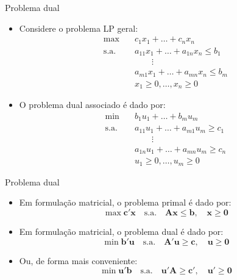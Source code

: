 \documentclass[10pt]{beamer}
\begin{document}
\begin{frame}{Problema dual}
    \begin{itemize}
        \item Considere o problema LP geral:
        \begin{align}
            \max \quad & c_1 x_1 + \dots + c_n x_n \\
            \text{s.a.} \quad & a_{11}x_1 + \dots + a_{1n}x_n \leq b_1\nonumber\\
            & \qquad \vdots \nonumber\\
            & a_{m1}x_1 + \dots + a_{mn}x_n \leq b_m\nonumber\\
            & x_1 \geq 0, \dots, x_n \geq 0\nonumber
        \end{align}
        \item O problema dual associado é dado por:
        \begin{align}
            \min \quad & b_1 u_1 + \dots + b_m u_m \\
            \text{s.a.} \quad & a_{11}u_1 + \dots + a_{m1}u_m \geq c_1\nonumber\\
            & \qquad \vdots \nonumber\\
            & a_{1n}u_1 + \dots + a_{mn}u_m \geq c_n\nonumber\\
            & u_1 \geq 0, \dots, u_m \geq 0\nonumber
        \end{align}
    \end{itemize}
\end{frame}

\begin{frame}{Problema dual}
    \begin{itemize}
        \item Em formulação matricial, o problema primal é dado por:
        \begin{equation}
            \max \mathbf{c'x} \quad \text{s.a.} \quad \mathbf{Ax \leq b}, \quad \mathbf{x\geq 0}
        \end{equation}
        \item Em formulação matricial, o problema dual é dado por:
        \begin{equation}
            \min \mathbf{b'u} \quad \text{s.a.} \quad \mathbf{A'u \geq c}, \quad \mathbf{u\geq 0}
        \end{equation}
        \item Ou, de forma mais conveniente:
        \begin{equation}
            \min \mathbf{u'b} \quad \text{s.a.} \quad \mathbf{u'A \geq c'}, \quad \mathbf{u'\geq 0}
        \end{equation}
    \end{itemize}
\end{frame}
\end{document}
